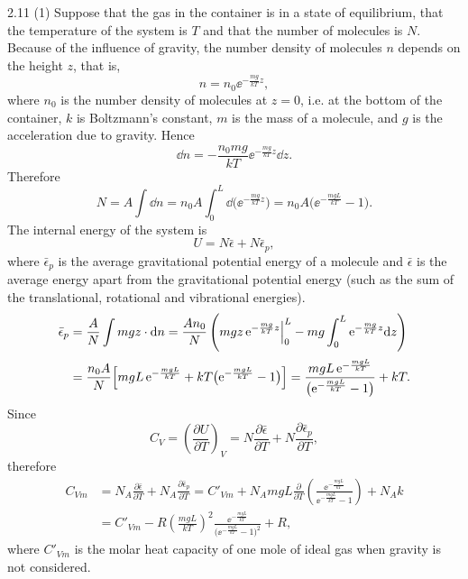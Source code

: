 \begin{solution}{2.11}
(1) Suppose that the gas in the container is in a state of equilibrium, that the temperature of the system is $T$ and that the number of molecules is $N$. Because of the influence of gravity, the number density of molecules $n$ depends on the height $z$, that is,
\[
n=n_0\ee^{-\frac{mg}{kT}z},
\]
where $n_0$ is the number density of molecules at $z=0$, i.e. at the bottom of the container, $k$ is Boltzmann's constant, $m$ is the mass of a molecule, and $g$ is the acceleration due to gravity. Hence
\[
\dd n=-\frac{n_0mg}{kT}\ee^{-\frac{mg}{kT}z}\dd z.
\]
Therefore
\[
N=A\int \dd n=n_0A\int_0^L \dd\bigl(\ee^{-\frac{mg}{kT}z}\bigr)
=n_0A\bigl(\ee^{-\frac{mgL}{kT}}-1\bigr).
\]
The internal energy of the system is
\[
U=N\bar{\epsilon}+N\bar{\epsilon}_p,
\]
where $\bar{\epsilon}_p$ is the average gravitational potential energy of a molecule and $\bar{\epsilon}$ is the average energy apart from the gravitational potential energy (such as the sum of the translational, rotational and vibrational energies).
\[
\begin{aligned}
\bar{\epsilon}_p&=\frac{A}{N}\int mgz\cdot \mathrm{d} n
=\frac{An_0}{N}\left(mgz\,\mathrm{e}^{-\frac{mg}{kT}z}\Big|_0^L-mg\int_0^L \mathrm{e}^{-\frac{mg}{kT}z}\mathrm{d} z\right)\\[2pt]
&=\frac{n_0A}{N}\Bigl[mgL\,\mathrm{e}^{-\frac{mgL}{kT}}+kT\bigl(\mathrm{e}^{-\frac{mgL}{kT}}-1\bigr)\Bigr]
=\frac{mgL\,\mathrm{e}^{-\frac{mgL}{kT}}}{\bigl(\mathrm{e}^{-\frac{mgL}{kT}}-1\bigr)}+kT.
\end{aligned}
\]
Since
\[
C_V=\left(\frac{\partial U}{\partial T}\right)_V
=N\frac{\partial \bar{\epsilon}}{\partial T}+N\frac{\partial \bar{\epsilon}_p}{\partial T},
\]
therefore
\[
\begin{aligned}
C_{Vm}&=N_A\frac{\partial \bar{\epsilon}}{\partial T}+N_A\frac{\partial \bar{\epsilon}_p}{\partial T}
=C'_{Vm}+N_AmgL\frac{\partial}{\partial T}\left(\frac{\ee^{-\frac{mgL}{kT}}}{\ee^{-\frac{mgL}{kT}}-1}\right)+N_Ak\\[2pt]
&=C'_{Vm}-R\left(\frac{mgL}{kT}\right)^2\frac{\ee^{-\frac{mgL}{kT}}}{\bigl(\ee^{-\frac{mgL}{kT}}-1\bigr)^2}+R,
\end{aligned}
\]
where $C'_{Vm}$ is the molar heat capacity of one mole of ideal gas when gravity is not considered.


\end{solution}
